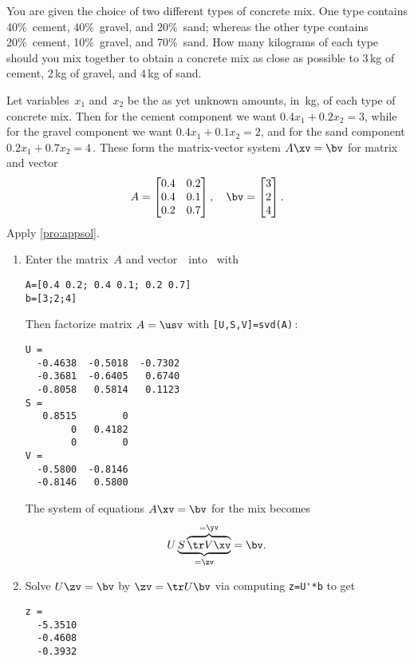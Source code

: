 \begin{reduce}
\begin{example} \label{eg:twotcm} %
You are given the choice of two different types of concrete mix.
One type contains 40\%~cement, 40\%~gravel, and 20\%~sand; whereas the other type contains 20\%~cement, 10\%~gravel, and 70\%~sand.
How many kilograms of each type should you mix together to obtain a concrete mix as close as possible to \(3\)\,kg of cement, \(2\)\,kg of gravel, and \(4\)\,kg of sand.
\begin{solution} 
Let variables~\(x_1\) and~\(x_2\) be the as yet unknown amounts, in~kg, of each type of concrete mix. 
Then for the cement component we want \(0.4x_1+0.2x_2=3\), while for the gravel component we want \(0.4x_1+0.1x_2=2\), and for the sand component \(0.2x_1+0.7x_2=4\)\,.
These form the matrix-vector system \(A\xv=\bv\) for matrix and vector
\begin{equation*}
A=\begin{bmatrix} 0.4&0.2\\0.4&0.1\\0.2&0.7 \end{bmatrix},
\quad \bv=\begin{bmatrix} 3\\2\\4 \end{bmatrix}.
\end{equation*}
Apply \autoref{pro:appsol}.
\begin{enumerate}
\item Enter the matrix~\(A\) and vector~\bv\ into \script\ with
\setbox\ajrqrbox\hbox{}%
\marginajrbox%
\begin{verbatim}
A=[0.4 0.2; 0.4 0.1; 0.2 0.7]
b=[3;2;4]
\end{verbatim}
Then factorize matrix \(A=\usv\) with \verb|[U,S,V]=svd(A)|\,:
\begin{verbatim}
U =
  -0.4638  -0.5018  -0.7302
  -0.3681  -0.6405   0.6740
  -0.8058   0.5814   0.1123
S =
   0.8515        0
        0   0.4182
        0        0
V =
  -0.5800  -0.8146
  -0.8146   0.5800
\end{verbatim}
The system of equations \(A\xv=\bv\) for the mix becomes
\begin{equation*}
U\underbrace{S\overbrace{\tr V\xv}^{=\yv}}_{=\zv}
=\bv.
\end{equation*}
\item Solve \(U\zv=\bv\) by  \(\zv=\tr U\bv\) via computing \verb|z=U'*b| to get
\begin{verbatim}
z =
  -5.3510
  -0.4608
  -0.3932
\end{verbatim}


\end{enumerate}
\end{solution}
\end{example}
\end{reduce}

